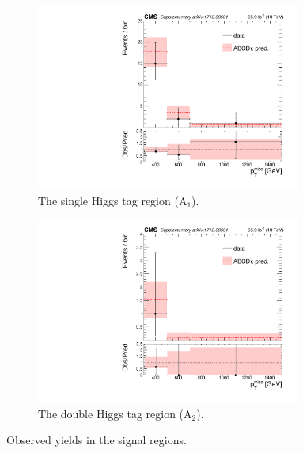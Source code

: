 \begin{figure}
\centering
\begin{subfigure}[b]{0.425\textwidth}
\centering
\includegraphics[trim={5px 5px 5px 5px},clip,width=0.95\textwidth]{figs/CMS-SUS-17-006_Figure-aux_004.pdf}
\caption{The single Higgs tag region (A$_{1}$).}
\end{subfigure}
\begin{subfigure}[b]{0.425\textwidth}
\centering
\includegraphics[trim={5px 5px 5px 5px},clip,width=0.95\textwidth]{figs/CMS-SUS-17-006_Figure-aux_005.pdf} 
\caption{The double Higgs tag region (A$_{2}$).}
\end{subfigure}
\caption{Observed yields in the signal regions.}
\label{fig:datayields}
\end{figure}

